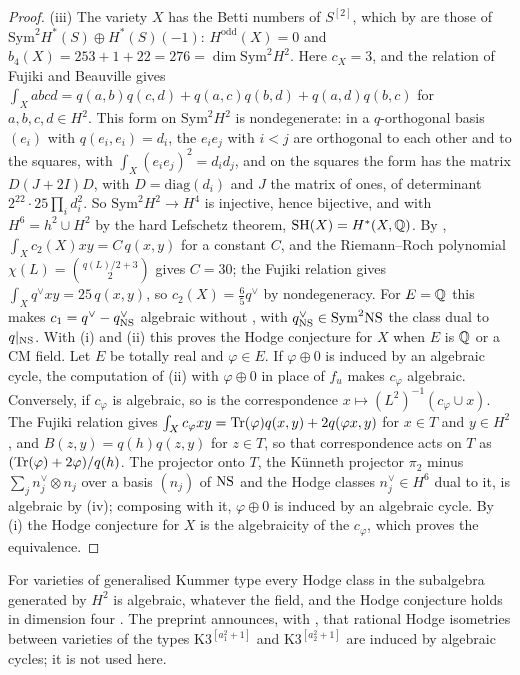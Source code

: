 \begin{proof}
(iii) The variety $X$ has the Betti numbers of $S^{[2]}$, which by
\cite{dCM02} are those of $\mathrm{Sym}^{2}H^{*}(S)\oplus H^{*}(S)(-1)$:
$H^{\mathrm{odd}}(X)=0$ and $b_{4}(X)=253+1+22=276=\dim\mathrm{Sym}^{2}H^{2}$.
Here $c_{X}=3$, and the relation of Fujiki and Beauville gives
$\int_{X}abcd=q(a,b)q(c,d)+q(a,c)q(b,d)+q(a,d)q(b,c)$ for $a,b,c,d\in H^{2}$.
This form on $\mathrm{Sym}^{2}H^{2}$ is nondegenerate: in a $q$-orthogonal
basis $(e_{i})$ with $q(e_{i},e_{i})=d_{i}$, the $e_{i}e_{j}$ with $i<j$ are
orthogonal to each other and to the squares, with $\int_{X}(e_{i}e_{j})^{2}=
d_{i}d_{j}$, and on the squares the form has the matrix $D(J+2I)D$, with
$D=\mathrm{diag}(d_{i})$ and $J$ the matrix of ones, of determinant
$2^{22}\cdot25\prod_{i}d_{i}^{2}$. So
$\mathrm{Sym}^{2}H^{2}\to H^{4}$ is injective, hence bijective, and with
$H^{6}=h^{2}\cup H^{2}$ by the hard Lefschetz theorem,
$\mathrm{SH}(X)=H^{*}(X,\mathbb{Q})$. By \cite{Fuj87},
$\int_{X}c_{2}(X)xy=C\,q(x,y)$ for a constant $C$, and the Riemann--Roch
polynomial $\chi(L)=\binom{q(L)/2+3}{2}$ \cite{EGL01} gives $C=30$; the
Fujiki relation gives $\int_{X}q^{\vee}xy=25\,q(x,y)$, so
$c_{2}(X)=\frac65q^{\vee}$ by nondegeneracy. For $E=\mathbb{Q}$ this makes
$c_{1}=q^{\vee}-q^{\vee}_{\mathrm{NS}}$ algebraic without \cite{CM13}, with
$q^{\vee}_{\mathrm{NS}}\in\mathrm{Sym}^{2}\mathrm{NS}$ the class dual to $q|_{\mathrm{NS}}$. With (i) and (ii) this proves the Hodge
conjecture for $X$ when $E$ is $\mathbb{Q}$ or a CM field. Let $E$ be totally real
and $\varphi\in E$. If $\varphi\oplus0$ is induced by an algebraic cycle, the
computation of (ii) with $\varphi\oplus0$ in place of $f_{u}$ makes
$c_{\varphi}$ algebraic. Conversely, if $c_{\varphi}$ is algebraic, so is the
correspondence $x\mapsto(L^{2})^{-1}(c_{\varphi}\cup x)$. The Fujiki relation
gives $\int_{X}c_{\varphi}xy=\operatorname{Tr}(\varphi)q(x,y)+2q(\varphi x,y)$ for $x\in T$
and $y\in H^{2}$, and $B(z,y)=q(h)q(z,y)$ for $z\in T$, so that
correspondence acts on $T$ as $(\operatorname{Tr}(\varphi)+2\varphi)/q(h)$. The projector
onto $T$, the K\"unneth projector $\pi_{2}$ minus
$\sum_{j}n_{j}^{\vee}\otimes n_{j}$ over a basis $(n_{j})$ of $\mathrm{NS}$ and the
Hodge classes $n_{j}^{\vee}\in H^{6}$ dual to it, is algebraic by
(iv); composing with it, $\varphi\oplus0$ is induced by an
algebraic cycle. By (i) the Hodge conjecture for $X$ is the algebraicity of
the $c_{\varphi}$, which proves the equivalence.
\end{proof}

For varieties of generalised Kummer type every Hodge class in the subalgebra
generated by $H^{2}$ is algebraic, whatever the field, and the Hodge
conjecture holds in dimension four \cite{FV25}. The preprint \cite{OG26}
announces, with \cite{Mar24}, that rational Hodge isometries between
varieties of the types K3$^{[a_{1}^{2}+1]}$ and K3$^{[a_{2}^{2}+1]}$ are
induced by algebraic cycles; it is not used here.

